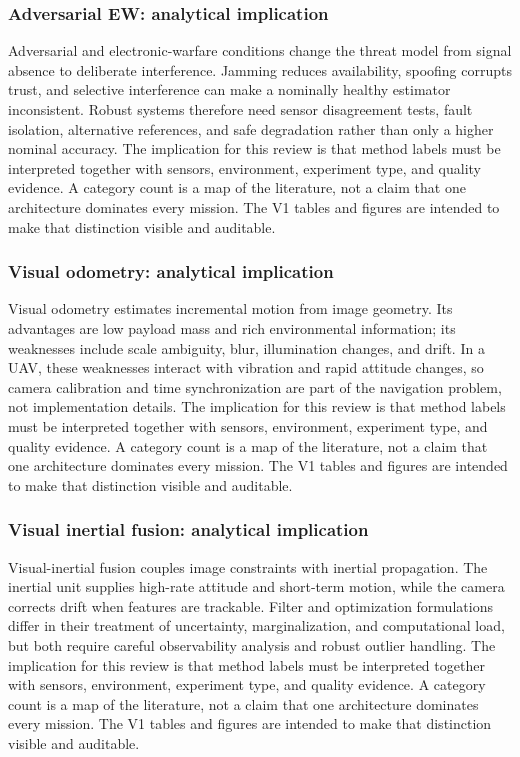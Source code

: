 \documentclass[
  journal,
  10pt]{IEEEtran}
\begin{document}
\subsubsection{Adversarial EW: analytical
implication}\label{adversarial-ew-analytical-implication}

Adversarial and electronic-warfare conditions change the threat model
from signal absence to deliberate interference. Jamming reduces
availability, spoofing corrupts trust, and selective interference can
make a nominally healthy estimator inconsistent. Robust systems
therefore need sensor disagreement tests, fault isolation, alternative
references, and safe degradation rather than only a higher nominal
accuracy. The implication for this review is that method labels must be
interpreted together with sensors, environment, experiment type, and
quality evidence. A category count is a map of the literature, not a
claim that one architecture dominates every mission. The V1 tables and
figures are intended to make that distinction visible and auditable.

\subsubsection{Visual odometry: analytical
implication}\label{visual-odometry-analytical-implication}

Visual odometry estimates incremental motion from image geometry. Its
advantages are low payload mass and rich environmental information; its
weaknesses include scale ambiguity, blur, illumination changes, and
drift. In a UAV, these weaknesses interact with vibration and rapid
attitude changes, so camera calibration and time synchronization are
part of the navigation problem, not implementation details. The
implication for this review is that method labels must be interpreted
together with sensors, environment, experiment type, and quality
evidence. A category count is a map of the literature, not a claim that
one architecture dominates every mission. The V1 tables and figures are
intended to make that distinction visible and auditable.

\subsubsection{Visual inertial fusion: analytical
implication}\label{visual-inertial-fusion-analytical-implication}

Visual-inertial fusion couples image constraints with inertial
propagation. The inertial unit supplies high-rate attitude and
short-term motion, while the camera corrects drift when features are
trackable. Filter and optimization formulations differ in their
treatment of uncertainty, marginalization, and computational load, but
both require careful observability analysis and robust outlier handling.
The implication for this review is that method labels must be
interpreted together with sensors, environment, experiment type, and
quality evidence. A category count is a map of the literature, not a
claim that one architecture dominates every mission. The V1 tables and
figures are intended to make that distinction visible and auditable.
\end{document}
